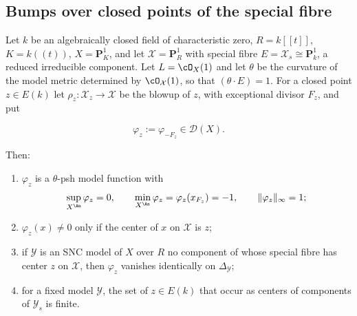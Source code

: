\subsection{Bumps over closed points of the special fibre}

\begin{lemma}
\label{lem:ch22-bump}
Let $k$ be an algebraically closed field of characteristic zero,
$R=k[[t]]$, $K=k((t))$, $X=\mathbf P^1_K$, and let
$\mathcal X=\mathbf P^1_R$ with special fibre $E=\mathcal X_s\cong
\mathbf P^1_k$, a reduced irreducible component.  Let $L=\cO_X(1)$ and let
$\theta$ be the curvature of the model metric determined by
$\cO_{\mathcal X}(1)$, so that $(\theta\cdot E)=1$.  For a closed point
$z\in E(k)$ let $\rho_z:\mathcal X_z\to\mathcal X$ be the blowup of
$z$, with exceptional divisor $F_z$, and put

\[
 \varphi_z:=\varphi_{-F_z}\in\mathcal D(X).
\tag{22.69}\label{eq:ch22-bump-function}
\]

Then:
\begin{enumerate}
\item\label{itm:ch22-bump:psh} $\varphi_z$ is a $\theta$-psh model
function with
\[
 \sup_{X^{\An}}\varphi_z=0,
 \qquad
 \min_{X^{\An}}\varphi_z=\varphi_z(x_{F_z})=-1,
 \qquad
 \|\varphi_z\|_\infty=1 ;
\]
\item\label{itm:ch22-bump:support} $\varphi_z(x)\neq0$ only if the center
of $x$ on $\mathcal X$ is $z$;
\item\label{itm:ch22-bump:invisible} if $\mathcal Y$ is an SNC model of $X$
over $R$ no component of whose special fibre has center $z$ on
$\mathcal X$, then $\varphi_z$ vanishes identically on
$\Delta_{\mathcal Y}$;
\item\label{itm:ch22-bump:centers} for a fixed model $\mathcal Y$, the set
of $z\in E(k)$ that occur as centers of components of
$\mathcal Y_s$ is finite.
\end{enumerate}
\end{lemma}

